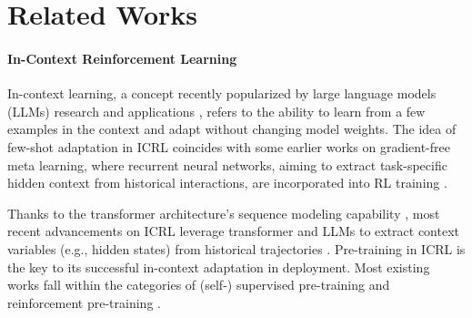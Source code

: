 \documentclass[letterpaper]{article} %
\begin{document}

\section{Related Works}
\label{sec:related}
\paragraph{In-Context Reinforcement Learning} In-context learning, a concept recently popularized by large language models (LLMs) research and applications \cite{dong-etal-2024-survey, tao-qz24symbiotic}, refers to the ability to learn from a few examples in the context and adapt without changing model weights. The idea of few-shot adaptation in ICRL coincides with some earlier works on gradient-free meta learning, where recurrent neural networks, aiming to extract task-specific hidden context from historical interactions, are incorporated into RL training \cite{botvinick16learnRL, abbeel16rl2}.  

Thanks to the transformer architecture's sequence modeling capability \cite{vaswani2017attention}, most recent advancements on ICRL leverage transformer and LLMs to extract context variables (e.g., hidden states) from historical trajectories \cite{lee2023supervised, tao23sce, krishnamurthy2024can}. Pre-training in ICRL is the key to its successful in-context adaptation in deployment. Most existing works fall within the categories of (self-) supervised pre-training and reinforcement pre-training \cite{moeini2025survey}.  
\end{document}
